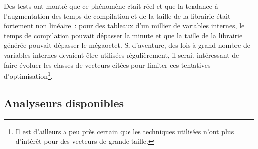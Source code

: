 \documentclass[rectoverso,pleiades,pstricks,leqno,anti]{texmf/note_technique_2010}
\begin{document}
Des tests ont montré que ce phénomène était réel et que la tendance à
l'augmentation des temps de compilation et de la taille de la librairie
était fortement non linéaire~: pour des tableaux d'un millier de
variables internes, le temps de compilation pouvait dépasser la minute
et que la taille de la librairie générée pouvait dépasser le mégaoctet.
Si d'aventure, des lois à grand nombre de variables internes devaient
être utilisées régulièrement, il serait intéressant de faire évoluer les
classes de vecteurs citées pour limiter ces tentatives
d'optimisation\footnote{Il est d'ailleurs a peu près certain que les
  techniques utilisées n'ont plus d'intérêt pour des vecteurs de grande
  taille.}.

\subsection{Analyseurs disponibles}
\end{document}
